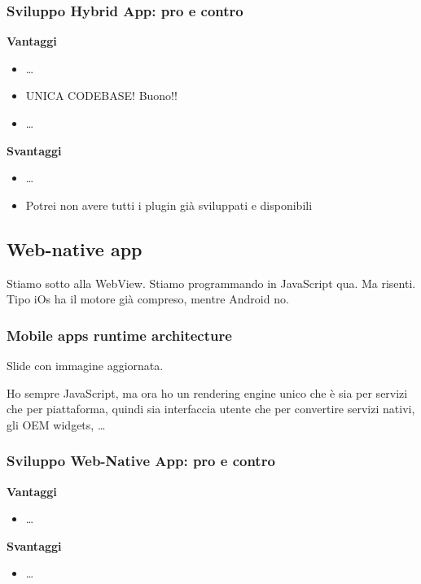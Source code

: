 \subsubsection{Sviluppo Hybrid App: pro e contro}
\par \textbf{Vantaggi}
\begin{itemize}
    \item \dots
    \item UNICA CODEBASE! Buono!!
    \item \dots
\end{itemize}

\par \textbf{Svantaggi}
\begin{itemize}
    \item \dots
    \item Potrei non avere tutti i plugin già sviluppati e disponibili
\end{itemize}

\subsection{Web-native app}
\par Stiamo sotto alla WebView. Stiamo programmando in JavaScript qua. Ma risenti. Tipo iOs ha il motore già compreso, mentre Android no.

\subsubsection{Mobile apps runtime architecture}
\par Slide con immagine aggiornata. 
\par Ho sempre JavaScript, ma ora ho un rendering engine unico che è sia per servizi che per piattaforma, quindi sia interfaccia utente che per convertire servizi nativi, gli OEM widgets, \dots

\subsubsection{Sviluppo Web-Native App: pro e contro}
\par \textbf{Vantaggi}
\begin{itemize}
    \item \dots
\end{itemize}
\par \textbf{Svantaggi}
\begin{itemize}
    \item \dots
\end{itemize}

